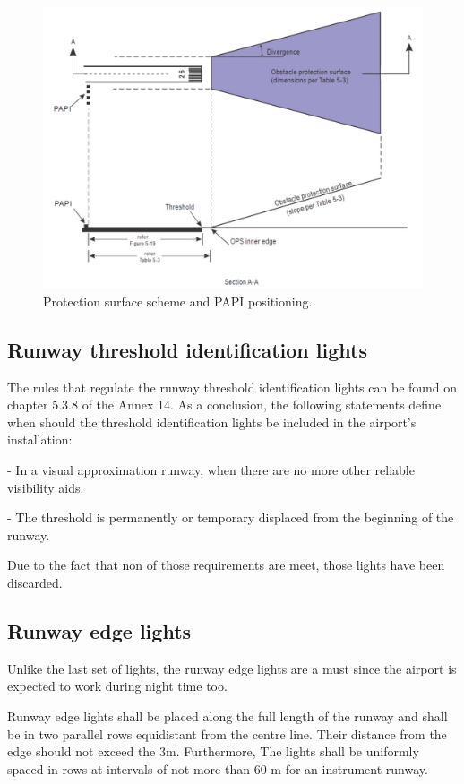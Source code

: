 		\begin{figure}[H]
			\centering
			\includegraphics[clip, trim=0cm 0cm 0cm 0cm, width=1\textwidth]{./images/Annex14/PAPIScheme}
			\caption{Protection surface scheme and PAPI positioning.} %
			\label{} %
		\end{figure}
		
		\subsection{Runway threshold identification lights}
		The rules that regulate the runway threshold identification lights can be found on chapter 5.3.8 of the Annex 14. As a conclusion, the following statements define when should the threshold identification lights be included in the airport's installation:
		
		- In a visual approximation runway, when there are no more other reliable visibility aids. 
		
		- The threshold is permanently or temporary displaced from the beginning of the runway.
		
		Due to the fact that non of those requirements are meet, those lights have been discarded.
		 
		\subsection{Runway edge lights}
		Unlike the last set of lights, the runway edge lights are a must since the airport is expected to work during night time too. 
		
		Runway edge lights shall be placed along the full length of the runway and shall be in two parallel rows equidistant from the centre line. Their distance from the edge should not exceed the 3m. Furthermore, The lights shall be uniformly spaced in rows at intervals of not more than 60 m for an instrument runway. 
		
